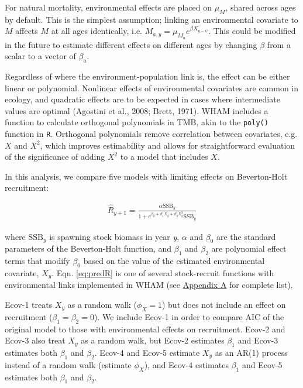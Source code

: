 \documentclass[]{article}
\begin{document}
For natural mortality, environmental effects are placed on \(\mu_M\),
shared across ages by default. This is the simplest assumption; linking
an environmental covariate to \(M\) affects \(M\) at all ages
identically, i.e. \(M_{a,y} = \mu_{M_a} e^{\beta X_{y-\psi}}\). This
could be modified in the future to estimate different effects on
different ages by changing \(\beta\) from a scalar to a vector of
\(\beta_a\).

Regardless of where the environment-population link is, the effect can
be either linear or polynomial. Nonlinear effects of environmental
covariates are common in ecology, and quadratic effects are to be
expected in cases where intermediate values are optimal (Agostini et
al., 2008; Brett, 1971). WHAM includes a function to calculate
orthogonal polynomials in TMB, akin to the \texttt{poly()} function in
\texttt{R}. Orthogonal polynomials remove correlation between
covariates, e.g. \(X\) and \(X^2\), which improves estimability and
allows for straightforward evaluation of the significance of adding
\(X^2\) to a model that includes \(X\).

In this analysis, we compare five models with limiting effects on
Beverton-Holt recruitment:

\begin{equation}
\label{eq:predR}
  \begin{array}{ccc}
    \hat{R}_{y+1} = \frac{\alpha \text{SSB}_{y}}{1 + e^{\beta_0 + \beta_1 X_{y} + \beta_2 X^2_{y}} \text{SSB}_y}
  \end{array}
\end{equation}

where \(\text{SSB}_y\) is spawning stock biomass in year \emph{y},
\(\alpha\) and \(\beta_0\) are the standard parameters of the
Beverton-Holt function, and \(\beta_1\) and \(\beta_2\) are polynomial
effect terms that modify \(\beta_0\) based on the value of the estimated
environmental covariate, \(X_y\). Eqn. \ref{eq:predR} is one of several
stock-recruit functions with environmental links implemented in WHAM
(see \protect\hyperlink{appendix-a}{Appendix A} for complete list).

Ecov-1 treats \(X_y\) as a random walk (\(\phi_X = 1\)) but does not
include an effect on recruitment (\(\beta_1 = \beta_2 = 0\)). We include
Ecov-1 in order to compare AIC of the original model to those with
environmental effects on recruitment. Ecov-2 and Ecov-3 also treat
\(X_y\) as a random walk, but Ecov-2 estimates \(\beta_1\) and Ecov-3
estimates both \(\beta_1\) and \(\beta_2\). Ecov-4 and Ecov-5 estimate
\(X_y\) as an AR(1) process instead of a random walk (estimate
\(\phi_X\)), and Ecov-4 estimates \(\beta_1\) and Ecov-5 estimates both
\(\beta_1\) and \(\beta_2\).
\end{document}
